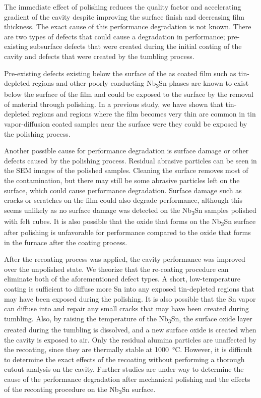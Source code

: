 \documentclass[reprint,amsmath,amssymb,aps]{revtex4-2}%
\begin{document}
The immediate effect of polishing reduces the quality factor and accelerating gradient of the cavity despite improving the surface finish and decreasing film thickness. The exact cause of this performance degradation is not known. There are two types of defects that could cause a degradation in performance; pre-existing subsurface defects that were created during the initial coating of the cavity and defects that were created by the tumbling process.

Pre-existing defects existing below the surface of the as coated film such as tin-depleted regions\cite{lee2018atomic} and other poorly conducting Nb\textsubscript{3}Sn phases are known to exist below the surface of the film and could be exposed to the surface by the removal of material through polishing. In a previous study, we have shown that tin-depleted regions and regions where the film becomes very thin are common in tin vapor-diffusion coated samples near the surface were they could be exposed by the polishing process\cite{10073616}. 

Another possible cause for performance degradation is surface damage or other defects caused by the polishing process. Residual abrasive particles can be seen in the SEM images of the polished samples. Cleaning the surface removes most of the contamination, but there may still be some abrasive particles left on the surface, which could cause performance degradation. Surface damage such as cracks or scratches on the film could also degrade performance, although this seems unlikely as no surface damage was detected on the Nb\textsubscript{3}Sn samples polished with felt cubes. It is also possible that the oxide that forms on the Nb\textsubscript{3}Sn surface after polishing is unfavorable for performance compared to the oxide that forms in the furnace after the coating process.

After the recoating process was applied, the cavity performance was improved over the unpolished state. We theorize that the re-coating procedure can eliminate both of the aforementioned defect types. A short, low-temperature coating is sufficient to diffuse more Sn into any exposed tin-depleted regions that may have been exposed during the polishing. It is also possible that the Sn vapor can diffuse into and repair any small cracks that may have been created during tumbling. Also, by raising the temperature of the Nb\textsubscript{3}Sn, the surface oxide layer created during the tumbling is dissolved, and a new surface oxide is created when the cavity is exposed to air. Only the residual alumina particles are unaffected by the recoating, since they are thermally stable at 1000~\unit{\celsius}. However, it is difficult to determine the exact effects of the recoating without performing a thorough cutout analysis on the cavity. Further studies are under way to determine the cause of the performance degradation after mechanical polishing and the effects of the recoating procedure on the Nb\textsubscript{3}Sn surface.
\end{document}
